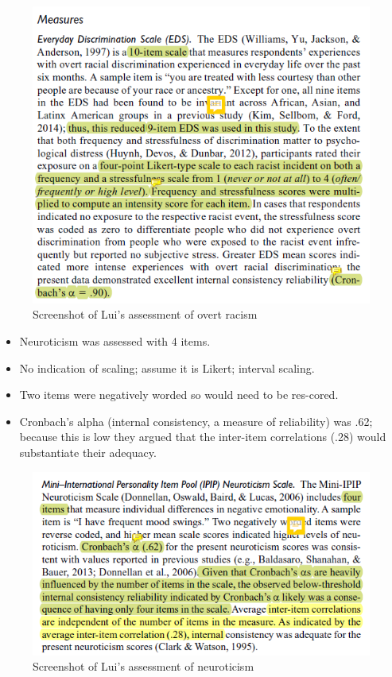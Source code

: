 \documentclass[
  english,
]{book}
\providecommand{\tightlist}{%
  \setlength{\itemsep}{0pt}\setlength{\parskip}{0pt}}
\begin{document}
\begin{figure}
\centering
\includegraphics{images/PsychoM/Lui1.png}
\caption{Screenshot of Lui's assessment of overt racism}
\end{figure}

\begin{itemize}
\tightlist
\item
  Neuroticism was assessed with 4 items.
\item
  No indication of scaling; assume it is Likert; interval scaling.
\item
  Two items were negatively worded so would need to be res-cored.
\item
  Cronbach's alpha (internal consistency, a measure of reliability) was .62; because this is low they argued that the inter-item correlations (.28) would substantiate their adequacy.
\end{itemize}

\begin{figure}
\centering
\includegraphics{images/PsychoM/Lui2.png}
\caption{Screenshot of Lui's assessment of neuroticism}
\end{figure}
\end{document}

